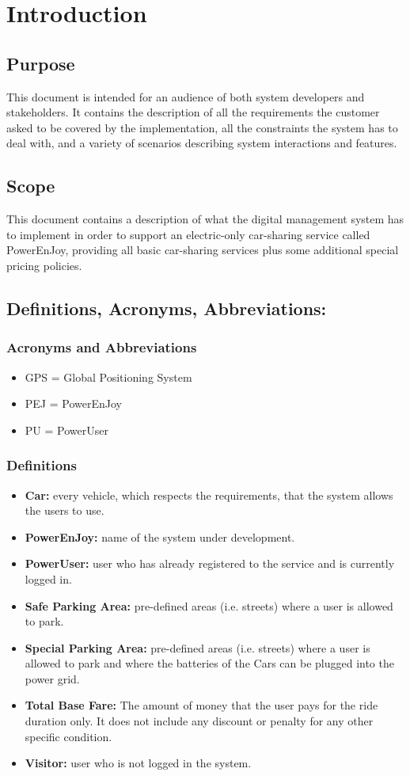 \section{Introduction}
\subsection{Purpose}
This document is intended for an audience of both system developers and stakeholders. It contains the description of all the requirements the customer asked to be covered by the implementation, all the constraints the system has to deal with, and a variety of scenarios describing system interactions and features.
\subsection{Scope}
This document contains a description of what the digital management system has to implement in order to support an electric-only car-sharing service called PowerEnJoy, providing all basic car-sharing services plus some additional special pricing policies.
\subsection{Definitions, Acronyms, Abbreviations:}
\subsubsection{Acronyms and Abbreviations}
\begin{itemize}
\item GPS = Global Positioning System
\item PEJ = PowerEnJoy
\item PU = PowerUser
\end{itemize}
\subsubsection{Definitions}
\begin{itemize}
\item \textbf{Car:} every vehicle, which respects the requirements, that the system allows the users to use.
\item \textbf{PowerEnJoy:} name of the system under development.
\item \textbf{PowerUser:} user who has already registered to the service and is currently logged in.
\item \textbf{Safe Parking Area:} pre-defined areas (i.e. streets) where a user is allowed to park.
\item \textbf{Special Parking Area:}  pre-defined areas (i.e. streets) where a user is allowed to park and where the batteries of the Cars can be plugged into the power grid.
\item \textbf{Total Base Fare:} The amount of money that the user pays for the ride duration only. It does not include any discount or penalty for any other specific condition.
\item \textbf{Visitor:} user who is not logged in the system.
\end{itemize}
